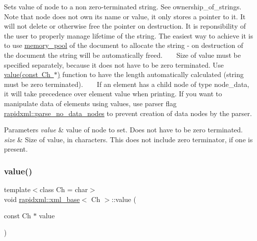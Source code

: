 Sets value of node to a non zero-\/terminated string. See ownership\+\_\+of\+\_\+strings. ~\newline
~\newline
 Note that node does not own its name or value, it only stores a pointer to it. It will not delete or otherwise free the pointer on destruction. It is reponsibility of the user to properly manage lifetime of the string. The easiest way to achieve it is to use \mbox{\hyperlink{classrapidxml_1_1memory__pool}{memory\+\_\+pool}} of the document to allocate the string -\/ on destruction of the document the string will be automatically freed. ~\newline
~\newline
 Size of value must be specified separately, because it does not have to be zero terminated. Use \mbox{\hyperlink{classrapidxml_1_1xml__base_a81e63ec4bfd2d7ef0a6c2ed49be6e623}{value(const Ch $\ast$)}} function to have the length automatically calculated (string must be zero terminated). ~\newline
~\newline
 If an element has a child node of type node\+\_\+data, it will take precedence over element value when printing. If you want to manipulate data of elements using values, use parser flag \mbox{\hyperlink{namespacerapidxml_ac2d21ef14a4e8936b94aca5d38b1a74d}{rapidxml\+::parse\+\_\+no\+\_\+data\+\_\+nodes}} to prevent creation of data nodes by the parser. 
\begin{DoxyParams}{Parameters}
{\em value} & value of node to set. Does not have to be zero terminated. \\
\hline
{\em size} & Size of value, in characters. This does not include zero terminator, if one is present. \\
\hline
\end{DoxyParams}
\mbox{\label{classrapidxml_1_1xml__base_a81e63ec4bfd2d7ef0a6c2ed49be6e623}} 
\subsubsection{\texorpdfstring{value()}{value()}\hspace{0.1cm}{\footnotesize\ttfamily [5/6]}}
{\footnotesize\ttfamily template$<$class Ch  = char$>$ \\
void \mbox{\hyperlink{classrapidxml_1_1xml__base}{rapidxml\+::xml\+\_\+base}}$<$ Ch $>$\+::value (\begin{DoxyParamCaption}\item[{const Ch $\ast$}]{value }\end{DoxyParamCaption})\hspace{0.3cm}{\ttfamily [inline]}}


